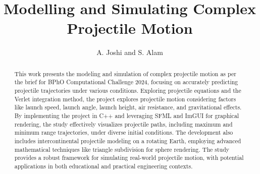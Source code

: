 \documentclass[a4paper,11pt]{article}
\title{\textbf{Modelling and Simulating Complex Projectile Motion}}
\author{A. Joshi and S. Alam}
\date{}
\begin{document}
\maketitle

\begin{abstract}
\noindent This work presents the modeling and simulation of complex projectile motion as per the brief for BPhO Computational Challenge 2024, focusing on accurately predicting projectile trajectories under various conditions. Exploring projectile equations and the Verlet integration method, the project explores projectile motion considering factors like launch speed, launch angle, launch height, air resistance, and gravitational effects. By implementing the project in C++ and leveraging SFML and ImGUI for graphical rendering, the study effectively visualizes projectile paths, including maximum and minimum range trajectories, under diverse initial conditions. The development also includes intercontinental projectile modeling on a rotating Earth, employing advanced mathematical techniques like triangle subdivision for sphere rendering. The study provides a robust framework for simulating real-world projectile motion, with potential applications in both educational and practical engineering contexts.
\end{abstract}

\begin{multicols}{2}


\twocolumn


\newpage


\newpage

\printbibliography


\end{multicols}
\end{document}
